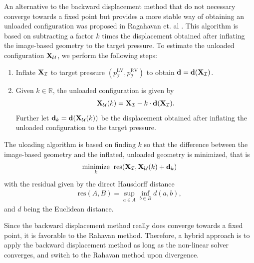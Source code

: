 An alternative to the backward displacement method that do not
necessary converge towards a fixed point but provides a more stable
way of obtaining an unloaded configuration was proposed in Ragahavan
et. al \cite{raghavan2006non}.
This algorithm is based on subtracting a factor $k$ times
the displacement obtained after inflating the image-based geometry to
the target pressure. To estimate the
unloaded configuration $\mathbf{X}_{\mathcal{U}}$, we perform the following steps:
\begin{enumerate}
  \item Inflate $\mathbf{X}_{\mathcal{I}}$ to target
    pressure $(p_{\mathcal{I}}^{\mathrm{LV}},
    p_{\mathcal{I}}^{\mathrm{RV}})$ to obtain
    $\mathbf{d} = \mathbf{d}(\mathbf{X}_{\mathcal{I}})$.
  \item Given $k \in \mathbb{R}$, the unloaded configuration is given by
    \begin{align}
      \mathbf{X}_{\mathcal{U}}(k) = \mathbf{X}_{\mathcal{I}} - k \cdot \mathbf{d}(\mathbf{X}_{\mathcal{I}}).
     \end{align}
     Further let $\mathbf{d}_k = \mathbf{d}(\mathbf{X}_{\mathcal{U}}(k))$
     be the displacement obtained after inflating the unloaded
     configuration to the target pressure.
   \end{enumerate}
The uloading algorithm is based on finding $k$ so that the difference
between the image-based geometry and the inflated, unloaded geometry
is minimized, that is 
\begin{align}
  \underset{k}{\text{minimize}}
  \;\;  \mathrm{res} ( \mathbf{X}_{\mathcal{I}}, \mathbf{X}_{\mathcal{U}}(k) + \mathbf{d}_k)
  \label{eq:unloading_Raghavan}
\end{align}
with the residual given by the direct Hausdorff distance \cite{huttenlocher1993comparing}
\begin{align}
  \mathrm{res}(A, B) = \sup_{a \in A} \inf_{b \in B} d(a, b), 
\end{align}
and $d$ being the Euclidean distance. 



Since the backward displacement method really does converge towards a
fixed point, it is favorable to the Rahavan method. Therefore, a
hybrid approach is to apply the backward displacement method as
long as the non-linear solver converges, and switch to the Rahavan
method upon divergence.


